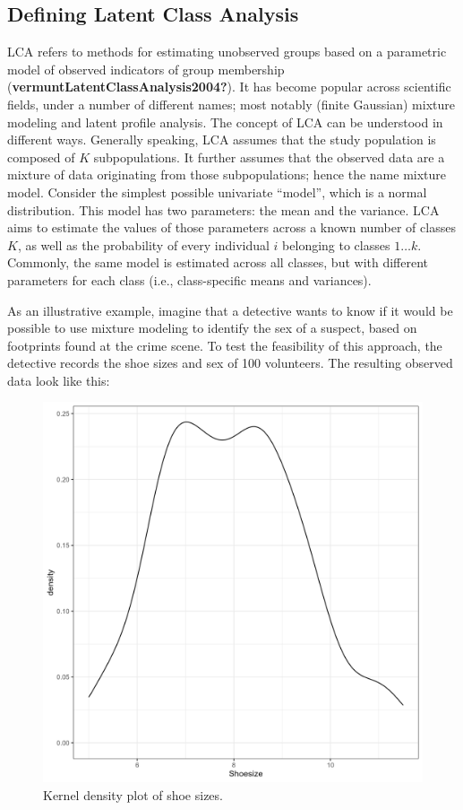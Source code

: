 \documentclass[
  ,man,floatsintext]{apa6}
\begin{document}
\hypertarget{defining-latent-class-analysis}{%
\subsection{Defining Latent Class Analysis}\label{defining-latent-class-analysis}}

LCA refers to methods for estimating unobserved
groups based on a parametric model of observed indicators of group
membership (\textbf{vermuntLatentClassAnalysis2004?}).
It has become popular across scientific fields,
under a number of different names;
most notably (finite Gaussian) mixture modeling and latent profile analysis.
The concept of LCA can be understood in different ways.
Generally speaking, LCA assumes that the study population is composed of \(K\)
subpopulations.
It further assumes that the observed data are
a mixture of data originating from those subpopulations;
hence the name mixture model.
Consider the simplest possible
univariate ``model'', which is a normal distribution.
This model has
two parameters: the mean and the variance.
LCA aims to estimate the values of those parameters across a known number of classes \(K\),
as well as the probability of every individual \(i\) belonging to classes \(1 \ldots k\).
Commonly, the same model is estimated across all classes,
but with different parameters for each class (i.e., class-specific means and variances).

As an illustrative example, imagine that a detective wants to know if it
would be possible to use mixture modeling to identify the sex of a
suspect, based on footprints found at the crime scene. To test the
feasibility of this approach, the detective records the shoe sizes and
sex of 100 volunteers. The resulting observed data look like this:

\begin{figure}
\includegraphics[width=7in]{shoedens} \caption{Kernel density plot of shoe sizes.}\label{fig:shoedens}
\end{figure}
\end{document}
